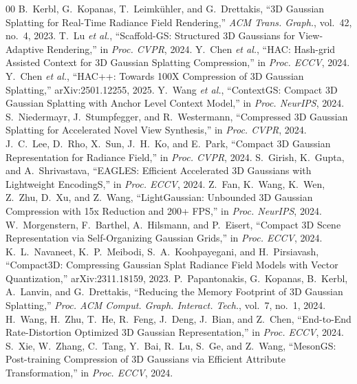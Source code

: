 \documentclass{ieeeaccess}
\begin{document}
\begin{thebibliography}{00}
 B.~Kerbl, G.~Kopanas, T.~Leimk\"uhler, and G.~Drettakis, ``3D Gaussian Splatting for Real-Time Radiance Field Rendering,'' \emph{ACM Trans. Graph.}, vol.~42, no.~4, 2023.
 T.~Lu \emph{et al.}, ``Scaffold-GS: Structured 3D Gaussians for View-Adaptive Rendering,'' in \emph{Proc. CVPR}, 2024.
 Y.~Chen \emph{et al.}, ``HAC: Hash-grid Assisted Context for 3D Gaussian Splatting Compression,'' in \emph{Proc. ECCV}, 2024.
 Y.~Chen \emph{et al.}, ``HAC++: Towards 100X Compression of 3D Gaussian Splatting,'' arXiv:2501.12255, 2025.
 Y.~Wang \emph{et al.}, ``ContextGS: Compact 3D Gaussian Splatting with Anchor Level Context Model,'' in \emph{Proc. NeurIPS}, 2024.
 S.~Niedermayr, J.~Stumpfegger, and R.~Westermann, ``Compressed 3D Gaussian Splatting for Accelerated Novel View Synthesis,'' in \emph{Proc. CVPR}, 2024.
 J.~C.~Lee, D.~Rho, X.~Sun, J.~H.~Ko, and E.~Park, ``Compact 3D Gaussian Representation for Radiance Field,'' in \emph{Proc. CVPR}, 2024.
 S.~Girish, K.~Gupta, and A.~Shrivastava, ``EAGLES: Efficient Accelerated 3D Gaussians with Lightweight EncodingS,'' in \emph{Proc. ECCV}, 2024.
 Z.~Fan, K.~Wang, K.~Wen, Z.~Zhu, D.~Xu, and Z.~Wang, ``LightGaussian: Unbounded 3D Gaussian Compression with 15x Reduction and 200+ FPS,'' in \emph{Proc. NeurIPS}, 2024.
 W.~Morgenstern, F.~Barthel, A.~Hilsmann, and P.~Eisert, ``Compact 3D Scene Representation via Self-Organizing Gaussian Grids,'' in \emph{Proc. ECCV}, 2024.
 K.~L.~Navaneet, K.~P.~Meibodi, S.~A.~Koohpayegani, and H.~Pirsiavash, ``Compact3D: Compressing Gaussian Splat Radiance Field Models with Vector Quantization,'' arXiv:2311.18159, 2023.
 P.~Papantonakis, G.~Kopanas, B.~Kerbl, A.~Lanvin, and G.~Drettakis, ``Reducing the Memory Footprint of 3D Gaussian Splatting,'' \emph{Proc. ACM Comput. Graph. Interact. Tech.}, vol.~7, no.~1, 2024.
 H.~Wang, H.~Zhu, T.~He, R.~Feng, J.~Deng, J.~Bian, and Z.~Chen, ``End-to-End Rate-Distortion Optimized 3D Gaussian Representation,'' in \emph{Proc. ECCV}, 2024.
 S.~Xie, W.~Zhang, C.~Tang, Y.~Bai, R.~Lu, S.~Ge, and Z.~Wang, ``MesonGS: Post-training Compression of 3D Gaussians via Efficient Attribute Transformation,'' in \emph{Proc. ECCV}, 2024.

\end{thebibliography}
\end{document}
